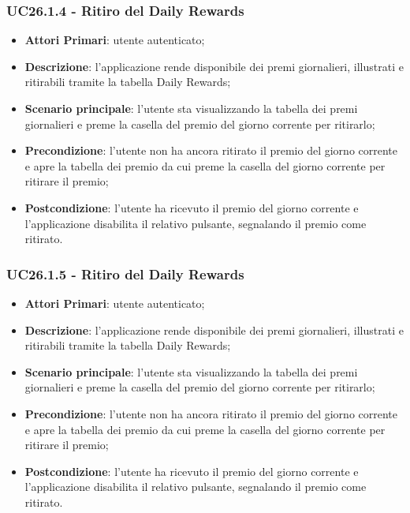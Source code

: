 \subsubsection{UC26.1.4 - Ritiro del Daily Rewards}
\begin{itemize}
	\item \textbf{Attori Primari}: utente autenticato;
	\item \textbf{Descrizione}: l'applicazione rende disponibile dei premi giornalieri, illustrati e ritirabili tramite la tabella Daily Rewards;
	\item \textbf{Scenario principale}: l'utente sta visualizzando la tabella dei premi giornalieri e preme la casella del premio del giorno corrente per ritirarlo;
	\item \textbf{Precondizione}: l'utente non ha ancora ritirato il premio del giorno corrente e apre la tabella dei premio da cui preme la casella del giorno corrente per ritirare il premio;
	\item \textbf{Postcondizione}: l'utente ha ricevuto il premio del giorno corrente e l'applicazione disabilita il relativo pulsante, segnalando il premio come ritirato. 
\end{itemize}
\subsubsection{UC26.1.5 - Ritiro del Daily Rewards}
\begin{itemize}
	\item \textbf{Attori Primari}: utente autenticato;
	\item \textbf{Descrizione}: l'applicazione rende disponibile dei premi giornalieri, illustrati e ritirabili tramite la tabella Daily Rewards;
	\item \textbf{Scenario principale}: l'utente sta visualizzando la tabella dei premi giornalieri e preme la casella del premio del giorno corrente per ritirarlo;
	\item \textbf{Precondizione}: l'utente non ha ancora ritirato il premio del giorno corrente e apre la tabella dei premio da cui preme la casella del giorno corrente per ritirare il premio;
	\item \textbf{Postcondizione}: l'utente ha ricevuto il premio del giorno corrente e l'applicazione disabilita il relativo pulsante, segnalando il premio come ritirato. 
\end{itemize}


